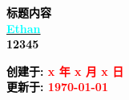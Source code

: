 \begin{flushright}
    \vspace*{7cm} 
    \Huge\bfseries  
    \textcolor{black}{\textbf{标题内容}}\\[1cm]  %
    \huge\bfseries  
    \href{https://hanlife02.com.cn/}{\textcolor{cyan}{Ethan}}\\[1cm]  %
    \huge\bfseries
    \textcolor{black}{12345}\\[1cm] %
\end{flushright}

\begin{flushleft}
    \vspace*{7.5cm}
    \large\bfseries
    \textcolor{black}{创建于:}
    \textcolor{red}{x 年 x 月 x 日}\\[1cm] %
    \large\bfseries 
    \textcolor{black}{更新于:}
    \textcolor{red}{\today}
\end{flushleft}

\newpage

\tableofcontents
\newpage

